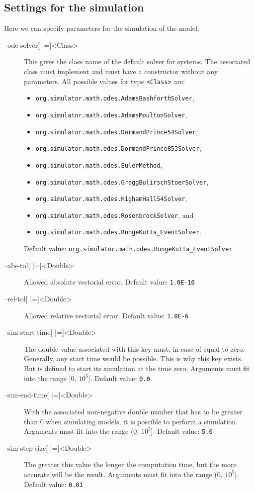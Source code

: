 \subsection{Settings for the simulation}
Here we can specify parameters for the simulation of the model.
\begin{description}
\item[--ode-solver{[} |={]}<Class>]
          This gives the class name of the default solver for \ODE
          systems. The associated class must
          implement \AbstractDESSolver and must have a constructor without
          any parameters.
          All possible values for type \texttt{<Class>} are:
          \begin{itemize}
          \item\texttt{org.simulator.math.odes.AdamsBashforthSolver},
          \item\texttt{org.simulator.math.odes.AdamsMoultonSolver},
          \item\texttt{org.simulator.math.odes.DormandPrince54Solver},
          \item\texttt{org.simulator.math.odes.DormandPrince853Solver},
          \item\texttt{org.simulator.math.odes.EulerMethod},
          \item\texttt{org.simulator.math.odes.GraggBulirschStoerSolver},
          \item\texttt{org.simulator.math.odes.HighamHall54Solver},
          \item\texttt{org.simulator.math.odes.RosenbrockSolver}, and
          \item\texttt{org.simulator.math.odes.RungeKutta\_EventSolver}.
          \end{itemize}
          Default value: \texttt{org.simulator.math.odes.RungeKutta\_EventSolver}
\item[--abs-tol{[} |={]}<Double>] Allowed absolute vectorial error.
          Default value: \texttt{1.0E-10}
\item[--rel-tol{[} |={]}<Double>] Allowed relative vectorial error.
          Default value: \texttt{1.0E-6}
\item[--sim-start-time{[} |={]}<Double>]
          The double value associated with this key must, in case of \SBML
          equal to zero. Generally, any start time would be possible.
          This is why this key exists. But \SBML is defined to start its
          simulation at the time zero.
          Arguments must fit into the range {[}0, $10^5${]}.
          Default value: \texttt{0.0}
\item[--sim-end-time{[} |={]}<Double>]
          With the associated non-negative double number that has to be
          greater than 0 when simulating \SBML models, it is possible to
          perform a simulation.
          Arguments must fit into the range (0, $10^5${]}.
          Default value: \texttt{5.0}
\item[--sim-step-size{[} |={]}<Double>]
          The greater this value the longer the computation time, but the
          more accurate will be the result.
          Arguments must fit into the range (0, $10^5${]}.
          Default value: \texttt{0.01}
\end{description}

